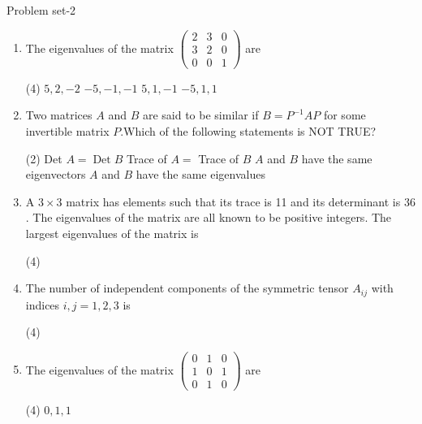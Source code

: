 \newpage
\begin{abox}
	Problem set-2
\end{abox}
\begin{enumerate}[label=\color{ocre}\textbf{\arabic*.}]
	\item The eigenvalues of the matrix $\left(\begin{array}{lll}2 & 3 & 0 \\ 3 & 2 & 0 \\ 0 & 0 & 1\end{array}\right)$ are
	{}
	\begin{tasks}(4)
		\task[\textbf{A.}] $5,2,-2$
		\task[\textbf{B.}] $-5,-1,-1$
		\task[\textbf{C.}]  $5,1,-1$
		\task[\textbf{D.}] $-5,1,1$
	\end{tasks}
	\item Two matrices $A$ and $B$ are said to be similar if $B=P^{-1} A P$ for some invertible matrix $P$.Which of the following statements is NOT TRUE?
	{}
	\begin{tasks}(2)
		\task[\textbf{A.}] Det $A=\operatorname{Det} B$
		\task[\textbf{B.}]  Trace of $A=$ Trace of $B$
		\task[\textbf{C.}] $A$ and $B$ have the same eigenvectors
		\task[\textbf{D.}] $A$ and $B$ have the same eigenvalues
	\end{tasks}
	\item A $3 \times 3$ matrix has elements such that its trace is 11 and its determinant is 36 . The eigenvalues of the matrix are all known to be positive integers. The largest eigenvalues of the matrix is
	{}
	\begin{tasks}(4)
	\end{tasks}
	\item  The number of independent components of the symmetric tensor $A_{i j}$ with indices $i, j=1,2,3$ is
	{}
	\begin{tasks}(4)
	\end{tasks}
	\item  The eigenvalues of the matrix $\left(\begin{array}{lll}0 & 1 & 0 \\ 1 & 0 & 1 \\ 0 & 1 & 0\end{array}\right)$ are
	{}
	\begin{tasks}(4)
		\task[\textbf{A.}] $0,1,1$

\end{tasks}
\end{enumerate}
